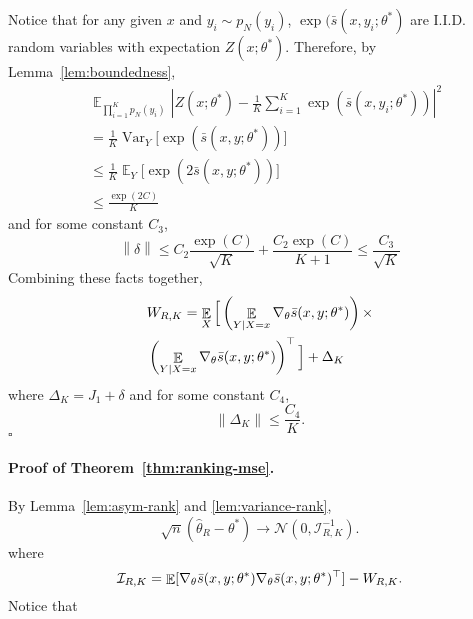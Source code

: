 \documentclass[11pt,a4paper]{article}
\newcommand{\qed}{\square}
\DeclareMathOperator{\E}{\mathbb{E}}
\newcommand{\var}{\operatorname{Var}}
\newcommand{\wh}[1]{\widehat{#1}}
\newcommand{\gtheta}{\ensuremath \nabla_{\theta}}
\newcommand{\ssf}[3]{\bar{s}(#1, #2; #3)}
\begin{document}
Notice that for any given $x$ and $y_i\sim p_N(y_i)$, $\exp( \ssf{x}{y_i}{\theta^*}$ are I.I.D. random variables with expectation $Z(x; \theta^*)$. Therefore, by Lemma~\ref{lem:boundedness},
\begin{equation*}
\begin{aligned}
& \E_{\prod_{i=1}^K p_N(y_i)} \left|Z(x; \theta^*) - \frac{1}{K}\sum_{i=1}^K \exp( \ssf{x}{y_i}{\theta^*})\right| ^2  \\
& = \frac{1}{K}\var_{Y} \Big[\exp \left(\ssf{x}{y}{\theta^*}\right) \Big]  \\
&\leq \frac{1}{K}\E_{Y} \Big[\exp \left(2\ssf{x}{y}{\theta^*}\right) \Big]\\
& \leq \frac{\exp(2C)}{K}
\end{aligned}
\end{equation*}
and for some constant $C_3$, 
\[
 \left\| \delta\right\| \leq C_2\frac{\exp(C)}{\sqrt{K}} + \frac{C_2\exp(C)}{K+1}\leq \frac{C_3}{\sqrt{K}}
\]
Combining these facts together, 
\begin{equation*}
\begin{aligned}
& W_{R, K} = \E_X \Big[ \left(\E_{Y|X = x}\gtheta \ssf{x}{y}{\theta^*}\right)  \times \\
&  \left(\E_{Y|X = x}\gtheta \ssf{x}{y}{\theta^*}\right)^\top \Big] + \Delta_K 
\end{aligned}
\end{equation*}
where $\Delta_K = J_1 + \delta$ and for some constant $C_4$, 
\[
\|\Delta_K\| \leq \frac{C_4}{K}.
\]
$\qed$


\paragraph{Proof of Theorem~\ref{thm:ranking-mse}.}
By Lemma~\ref{lem:asym-rank} and \ref{lem:variance-rank}, 
\[
\sqrt{n}(\wh{\theta}_R - \theta^*)\rightarrow \mathcal{N} \left(0, \mathcal{I}_{R, K}^{-1} \right).
\]
where 
\[
\mathcal{I}_{R, K} = \E [\gtheta \ssf{x}{y}{\theta^*}\gtheta \ssf{x}{y}{\theta^*}^\top] - W_{R, K}.
\]
Notice that 
\end{document}
